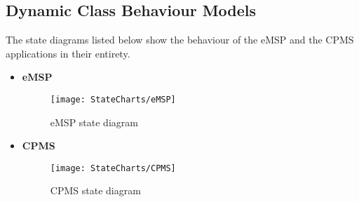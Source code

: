 \subsection{Dynamic Class Behaviour Models}
\label{subsec:statecharts}
The state diagrams listed below show the behaviour of the eMSP and the CPMS applications in their entirety.
\begin{itemize}
    \item \textbf{eMSP}
        \begin{figure}[H]
            \begin{center}
            \texttt{[image: StateCharts/eMSP]}
            \caption{eMSP state diagram}
            \label{fig:eMSP}
            \end{center}
        \end{figure}
        \newpage
    \item \textbf{CPMS}
        \begin{figure}[H]
            \begin{center}
            \texttt{[image: StateCharts/CPMS]}
            \caption{CPMS state diagram}
            \label{fig:CPMS}
            \end{center}
        \end{figure}
\end{itemize}
